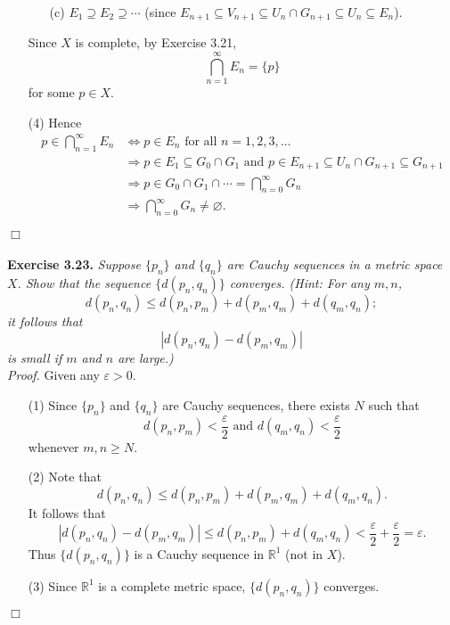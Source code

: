 \documentclass{article}
\begin{document}
\begin{enumerate}
\begin{enumerate}
  \item[(c)]
  $E_1 \supseteq E_2 \supseteq \cdots$
  (since
  $E_{n+1} \subseteq V_{n+1} \subseteq U_n \cap G_{n+1} \subseteq U_n \subseteq E_n$).
  \end{enumerate}
Since $X$ is complete, by Exercise 3.21,
$$\bigcap_{n=1}^{\infty} E_n = \{p\}$$
for some $p \in X$.
\item[(4)]
Hence
\begin{align*}
p \in \bigcap_{n=1}^{\infty} E_n
&\Longleftrightarrow
p \in E_n \text{ for all } n=1,2,3,\ldots \\
&\Longrightarrow
p \in E_1 \subseteq G_0 \cap G_1 \text{ and }
p \in E_{n+1} \subseteq U_n \cap G_{n+1} \subseteq G_{n+1} \\
&\Longrightarrow
p \in G_0 \cap G_1 \cap \cdots = \bigcap_{n=0}^{\infty} G_n \\
&\Longrightarrow
\bigcap_{n=0}^{\infty} G_n \neq \varnothing.
\end{align*}
\end{enumerate}
$\Box$ \\\\






\textbf{Exercise 3.23.}
\emph{Suppose $\{p_n\}$ and $\{q_n\}$ are Cauchy sequences in a metric space $X$.
Show that the sequence $\{d(p_n,q_n)\}$ converges.
(Hint: For any $m, n$,
$$d(p_n,q_n) \leq d(p_n,p_m) + d(p_m,q_m) + d(q_m,q_n);$$
it follows that
$$|d(p_n,q_n) - d(p_m,q_m)|$$
is small if $m$ and $n$ are large.)} \\

\emph{Proof.}
Given any $\varepsilon > 0$.
\begin{enumerate}
\item[(1)]
Since $\{p_n\}$ and $\{q_n\}$ are Cauchy sequences,
there exists $N$ such that
$$d(p_n,p_m) < \frac{\varepsilon}{2} \text{ and }
d(q_m,q_n) < \frac{\varepsilon}{2}$$ whenever $m, n \geq N$.
\item[(2)]
Note that
$$d(p_n,q_n) \leq d(p_n,p_m) + d(p_m,q_m) + d(q_m,q_n).$$
It follows that
$$|d(p_n,q_n) - d(p_m,q_m)|
\leq d(p_n,p_m) + d(q_m,q_n)
< \frac{\varepsilon}{2} + \frac{\varepsilon}{2}
= \varepsilon.$$
Thus $\{d(p_n,q_n)\}$ is a Cauchy sequence in $\mathbb{R}^1$ (not in $X$).
\item[(3)]
Since $\mathbb{R}^1$ is a complete metric space, $\{d(p_n,q_n)\}$ converges.
\end{enumerate}
$\Box$ \\\\
\end{document}
